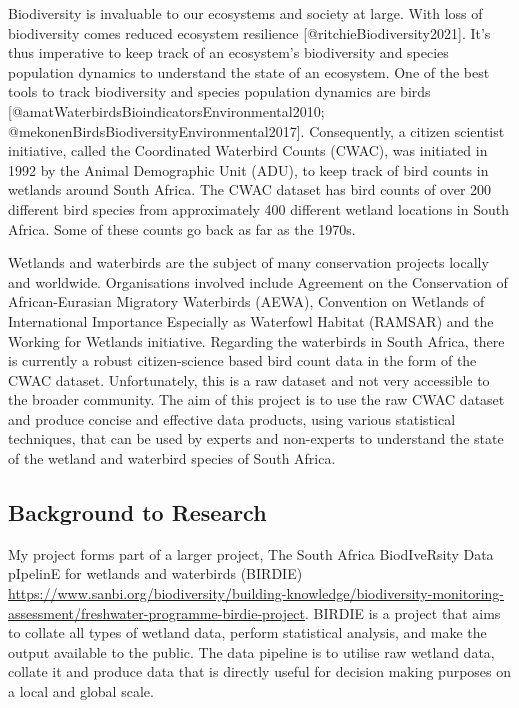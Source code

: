 \documentclass[
]{article}
\begin{document}
Biodiversity is invaluable to our ecosystems and society at large. With
loss of biodiversity comes reduced ecosystem resilience
{[}@ritchieBiodiversity2021{]}. It's thus imperative to keep track of an
ecosystem's biodiversity and species population dynamics to understand
the state of an ecosystem. One of the best tools to track biodiversity
and species population dynamics are birds
{[}@amatWaterbirdsBioindicatorsEnvironmental2010;
@mekonenBirdsBiodiversityEnvironmental2017{]}. Consequently, a citizen
scientist initiative, called the Coordinated Waterbird Counts (CWAC),
was initiated in 1992 by the Animal Demographic Unit (ADU), to keep
track of bird counts in wetlands around South Africa. The CWAC dataset
has bird counts of over 200 different bird species from approximately
400 different wetland locations in South Africa. Some of these counts go
back as far as the 1970s.

Wetlands and waterbirds are the subject of many conservation projects
locally and worldwide. Organisations involved include Agreement on the
Conservation of African-Eurasian Migratory Waterbirds (AEWA), Convention
on Wetlands of International Importance Especially as Waterfowl Habitat
(RAMSAR) and the Working for Wetlands initiative. Regarding the
waterbirds in South Africa, there is currently a robust citizen-science
based bird count data in the form of the CWAC dataset. Unfortunately,
this is a raw dataset and not very accessible to the broader community.
The aim of this project is to use the raw CWAC dataset and produce
concise and effective data products, using various statistical
techniques, that can be used by experts and non-experts to understand
the state of the wetland and waterbird species of South Africa.

\hypertarget{background-to-research}{%
\subsection{Background to Research}\label{background-to-research}}

My project forms part of a larger project, The South Africa BiodIveRsity
Data pIpelinE for wetlands and waterbirds (BIRDIE)
\url{https://www.sanbi.org/biodiversity/building-knowledge/biodiversity-monitoring-assessment/freshwater-programme-birdie-project}.
BIRDIE is a project that aims to collate all types of wetland data,
perform statistical analysis, and make the output available to the
public. The data pipeline is to utilise raw wetland data, collate it and
produce data that is directly useful for decision making purposes on a
local and global scale.
\end{document}
